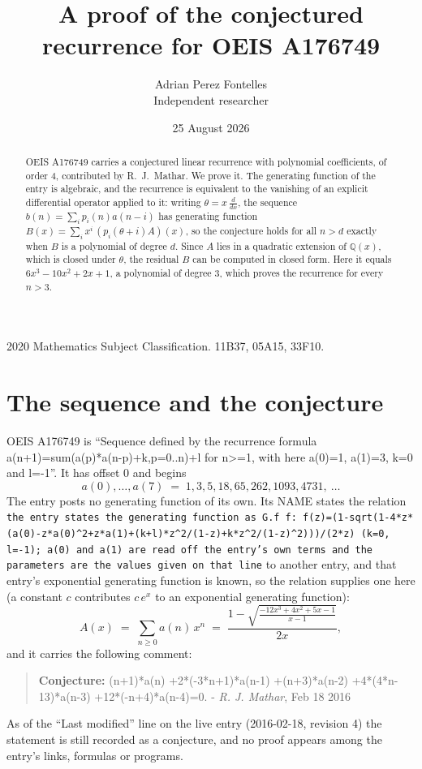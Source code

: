 \documentclass[11pt,a4paper]{article}
\title{A proof of the conjectured recurrence for OEIS A176749}
\author{Adrian Perez Fontelles\\ \small Independent researcher}
\date{25 August 2026}
\theoremstyle{plain}
\theoremstyle{definition}
\begin{document}
\maketitle

\begin{abstract}
OEIS A176749 carries a conjectured linear recurrence with polynomial coefficients, of
order 4, contributed by R.~J.~Mathar. We prove it. The generating function of the
entry is algebraic, and the recurrence is equivalent to the vanishing of an explicit
differential operator applied to it: writing $\theta=x\,\frac{d}{dx}$, the sequence
$b(n)=\sum_{i}p_{i}(n)a(n-i)$ has generating function
$B(x)=\sum_{i}x^{i}\,(p_{i}(\theta+i)A)(x)$, so the conjecture holds for all $n>d$ exactly
when $B$ is a polynomial of degree $d$. Since $A$ lies in a quadratic extension of
$\mathbb{Q}(x)$, which is closed under $\theta$, the residual $B$ can be computed in
closed form. Here it equals $6 x^{3} - 10 x^{2} + 2 x + 1$, a polynomial of degree $3$, which proves
the recurrence for every $n>3$.
\end{abstract}

\noindent\small 2020 Mathematics Subject Classification. 11B37, 05A15, 33F10.\normalsize

\section{The sequence and the conjecture}

OEIS A176749 is ``Sequence defined by the recurrence formula a(n+1)=sum(a(p)*a(n-p)+k,p=0..n)+l for n>=1, with here a(0)=1, a(1)=3, k=0 and l=-1''. It has offset $0$ and begins
\[
a(0),\dots,a(7)\;=\;1, 3, 5, 18, 65, 262, 1093, 4731,\ \dots
\]
The entry posts no generating function of its own. Its NAME states the
relation \texttt{the entry states the generating function as G.f f: f(z)=(1-sqrt(1-4*z*(a(0)-z*a(0)\textasciicircum{}2+z*a(1)+(k+l)*z\textasciicircum{}2/(1-z)+k*z\textasciicircum{}2/(1-z)\textasciicircum{}2)))/(2*z) (k=0, l=-1); a(0) and a(1) are read off the entry's own terms and the parameters are the values given on that line} to another entry, and that entry's exponential generating
function is known, so the relation supplies one here (a constant $c$ contributes
$c\,e^{x}$ to an exponential generating function):
\begin{equation}\label{eq:gf}
A(x)\;=\;\sum_{n\ge 0} a(n)\,x^{n}\;=\;\frac{1 - \sqrt{\frac{- 12 x^{3} + 4 x^{2} + 5 x - 1}{x - 1}}}{2 x} ,
\end{equation}
and it carries the following comment:
\begin{quote}\small
\textbf{Conjecture:} (n+1)*a(n) +2*(-3*n+1)*a(n-1) +(n+3)*a(n-2) +4*(4*n-13)*a(n-3) +12*(-n+4)*a(n-4)=0. - \emph{R. J. Mathar}, Feb 18 2016
\end{quote}
As of the ``Last modified'' line on the live entry (2016-02-18, revision 4) the
statement is still recorded as a conjecture, and no proof appears among the entry's links,
formulas or programs.
\end{document}
